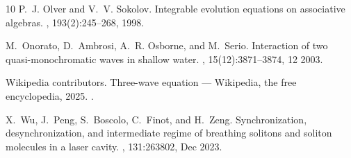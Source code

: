 \documentclass[10pt,a4paper]{article}
\numberwithin{equation}{section}
\theoremstyle{plain}
\theoremstyle{definition}
\begin{document}
\begin{thebibliography}{10}
P.~J. Olver and V.~V. Sokolov.
\newblock Integrable evolution equations on associative algebras.
, 193(2):245--268, 1998.

M.~Onorato, D.~Ambrosi, A.~R. Osborne, and M.~Serio.
\newblock Interaction of two quasi-monochromatic waves in shallow water.
, 15(12):3871--3874, 12 2003.

{Wikipedia contributors}.
\newblock Three-wave equation --- {Wikipedia}{,} the free encyclopedia, 2025.
.

X.~Wu, J.~Peng, S.~Boscolo, C.~Finot, and H.~Zeng.
\newblock Synchronization, desynchronization, and intermediate regime of
  breathing solitons and soliton molecules in a laser cavity.
, 131:263802, Dec 2023.

\end{thebibliography}


%

%
%
\end{document}
